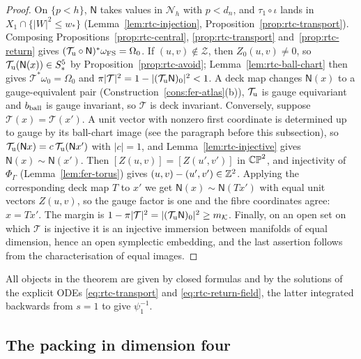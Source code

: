 \begin{proof}
On $\{p<h\}$, $\mathsf N$ takes values in $\mathcal N_h$ with $p<d_n$, and $\tau_1\circ\iota$ lands in
$X_1\cap\{|W|^2\le w_*\}$ (Lemma~\ref{lem:rtc-injection}, Proposition~\ref{prop:rtc-transport}). Composing
Propositions~\ref{prop:rtc-central}, \ref{prop:rtc-transport} and~\ref{prop:rtc-return} gives
$(\mathcal T_{\rm u}\circ\mathsf N)^*\omega_{\rm FS}=\Omega_0$. If $(u,v)\notin\mathcal Z$, then $Z_0(u,v)\ne0$, so
$\mathcal T_{\rm u}(\mathsf N(x))\in S^5_*$ by Proposition~\ref{prop:rtc-avoid}; Lemma~\ref{lem:rtc-ball-chart} then gives
$\mathcal T^*\omega_0=\Omega_0$ and $\pi|\mathcal T|^2=1-|(\mathcal T_{\rm u}\mathsf N)_0|^2<1$. A deck map changes $\mathsf N(x)$ to a
gauge-equivalent pair (Construction~\ref{cons:fer-atlas}(b)), $\mathcal T_{\rm u}$ is gauge equivariant and $b_{\rm ball}$ is gauge
invariant, so $\mathcal T$ is deck invariant. Conversely, suppose $\mathcal T(x)=\mathcal T(x')$. A unit vector with nonzero first
coordinate is determined up to gauge by its ball-chart image (see the paragraph before this subsection), so
$\mathcal T_{\rm u}(\mathsf N x)=c\,\mathcal T_{\rm u}(\mathsf Nx')$ with $|c|=1$, and Lemma~\ref{lem:rtc-injective} gives
$\mathsf N(x)\sim\mathsf N(x')$. Then $[Z(u,v)]=[Z(u',v')]$ in $\mathbb{CP}^2$, and injectivity of $\Phi_\Gamma$ (Lemma~\ref{lem:fer-torus})
gives $(u,v)-(u',v')\in\mathbb{Z}^2$. Applying the corresponding deck map $T$ to $x'$ we get $\mathsf N(x)\sim\mathsf N(Tx')$ with equal unit
vectors $Z(u,v)$, so the gauge factor is one and the fibre coordinates agree: $x=Tx'$. The margin is
$1-\pi|\mathcal T|^2=|(\mathcal T_{\rm u}\mathsf N)_0|^2\ge m_{\mathcal K}$. Finally, on an open set on which $\mathcal T$ is injective it
is an injective immersion between manifolds of equal dimension, hence an open symplectic embedding, and the last
assertion follows from the characterisation of equal images.
\end{proof}

All objects in the theorem are given by closed formulas and by the solutions of the explicit ODEs \eqref{eq:rtc-transport}
and \eqref{eq:rtc-return-field}, the latter integrated backwards from $s=1$ to give $\psi_1^{-1}$.

\subsection{The packing in dimension four}\label{sec:rtc-packing}

